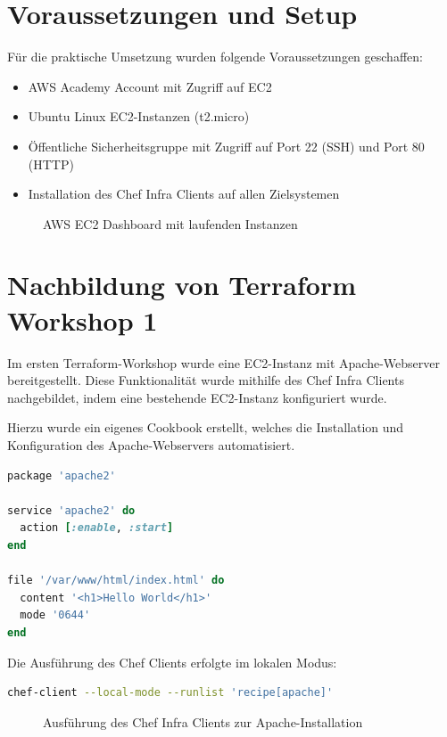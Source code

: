 \documentclass[BMR,Seminar,ngerman,IEEE]{twbook}
\newcommand{\placeholderfig}[2]{%
  \begin{figure}[htbp]
    \centering
    \fbox{\rule{0pt}{120pt}\rule{0.9\linewidth}{0pt}}%
    \caption{#1}%
    \label{fig:#2}%
  \end{figure}%
}
\begin{document}
\section{Voraussetzungen und Setup}

Für die praktische Umsetzung wurden folgende Voraussetzungen geschaffen:

\begin{itemize}
  \item AWS Academy Account mit Zugriff auf EC2
  \item Ubuntu Linux EC2-Instanzen (t2.micro)
  \item Öffentliche Sicherheitsgruppe mit Zugriff auf Port 22 (SSH) und Port 80 (HTTP)
  \item Installation des Chef Infra Clients auf allen Zielsystemen
\end{itemize}

\placeholderfig{AWS EC2 Dashboard mit laufenden Instanzen}{aws-ec2}

\section{Nachbildung von Terraform Workshop 1}

Im ersten Terraform-Workshop wurde eine EC2-Instanz mit Apache-Webserver bereitgestellt.
Diese Funktionalität wurde mithilfe des Chef Infra Clients nachgebildet, indem eine bestehende
EC2-Instanz konfiguriert wurde.

Hierzu wurde ein eigenes Cookbook erstellt, welches die Installation und Konfiguration des Apache-Webservers automatisiert.

\begin{lstlisting}[language=Ruby, caption={Chef-Rezept zur Installation und Konfiguration von Apache}]
package 'apache2'

service 'apache2' do
  action [:enable, :start]
end

file '/var/www/html/index.html' do
  content '<h1>Hello World</h1>'
  mode '0644'
end
\end{lstlisting}

Die Ausführung des Chef Clients erfolgte im lokalen Modus:

\begin{lstlisting}[language=bash]
chef-client --local-mode --runlist 'recipe[apache]'
\end{lstlisting}

\placeholderfig{Ausführung des Chef Infra Clients zur Apache-Installation}{chef-apache-run}
\end{document}
